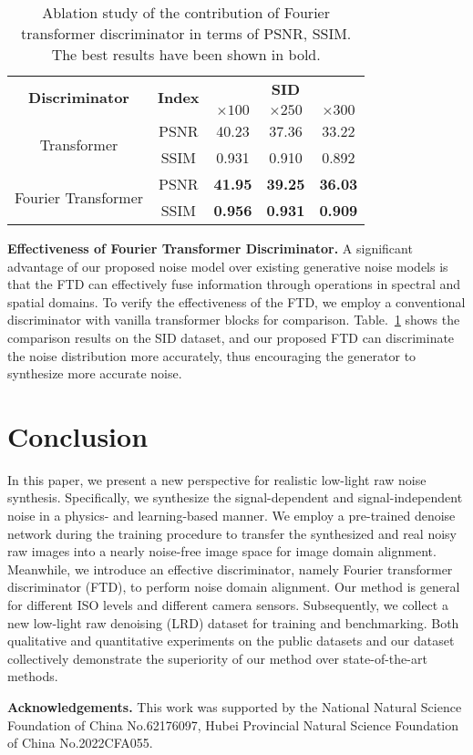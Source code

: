 \documentclass[10pt,twocolumn,letterpaper]{article}
\begin{document}
\begin{table}[t]
\centering
\caption{Ablation study of the contribution of Fourier transformer discriminator in terms of PSNR, SSIM. The best results have been shown in bold.}
\vspace{2pt}
\begin{tabular}{c|c|c|c|c}
\hline
\multirow{2}{*}{\textbf{Discriminator}} & \multirow{2}{*}{\textbf{Index}} & \multicolumn{3}{c}{\textbf{SID}} \\\cline{3-5}
& & \textbf{$\times100$} & \textbf{$\times250$} & \textbf{$\times300$} \\ \hline
\multirow{2}{*}{Transformer} & PSNR &40.23 &37.36 &33.22 \\ \cline{2-5}
& SSIM &0.931 &0.910 &0.892\\\hline
\multirow{2}{*}{Fourier Transformer} & PSNR &\textbf{41.95} &\textbf{39.25} &\textbf{36.03} \\ \cline{2-5}
& SSIM &\textbf{0.956} &\textbf{0.931} &\textbf{0.909}\\\hline
\end{tabular}
\label{table:ablation1}
\vspace{-2ex}
\end{table}

\textbf{Effectiveness of Fourier Transformer Discriminator.} A significant advantage of our proposed noise model over existing generative noise models is that the FTD can effectively fuse information through operations in spectral and spatial domains. To verify the effectiveness of the FTD, we employ a conventional discriminator with vanilla transformer blocks for comparison. Table.~\ref{table:ablation1} shows the comparison results on the SID dataset, and our proposed FTD can discriminate the noise distribution more accurately, thus encouraging the generator to synthesize more accurate noise.

\section{Conclusion}
\label{conclusion}
In this paper, we present a new perspective for realistic low-light raw noise synthesis. Specifically, we synthesize the signal-dependent and signal-independent noise in a physics- and learning-based manner. We employ a pre-trained denoise network during the training procedure to transfer the synthesized and real noisy raw images into a nearly noise-free image space for image domain alignment. Meanwhile, we introduce an effective discriminator, namely Fourier transformer discriminator (FTD), to perform noise domain alignment. Our method is general for different ISO levels and different camera sensors. Subsequently, we collect a new low-light raw denoising (LRD) dataset for training and benchmarking. Both qualitative and quantitative experiments on the public datasets and our dataset collectively demonstrate the superiority of our method over state-of-the-art methods.

\textbf{Acknowledgements.} This work was supported by the National Natural Science Foundation of China No.62176097, Hubei Provincial Natural Science Foundation of China No.2022CFA055.

{\small


}
\end{document}
